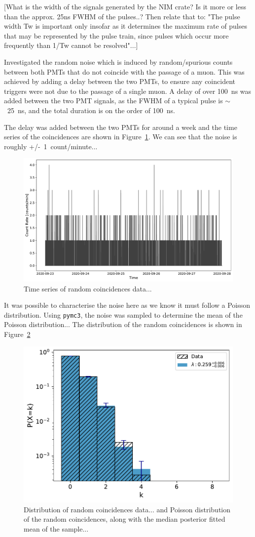 [What is the width of the signals generated by the NIM crate? Is it more or less than the approx. 25ns FWHM of the pulses..? Then relate that to: "The pulse width Tw is important only insofar as it determines the maximum rate of pulses that may be represented by the pulse train, since pulses which occur more frequently than 1/Tw cannot be resolved"...]


Investigated the random noise which is induced by random/spurious counts between both PMTs that do not coincide with the passage of a muon. This was achieved by adding a delay between the two PMTs, to ensure any coincident triggers were not due to the passage of a single muon. A delay of over 100~ns was added between the two PMT signals, as the FWHM of a typical pulse is $\sim$~25~ns, and the total duration is on the order of 100~ns.

The delay was added between the two PMTs for around a week and the time series of the coincidences are shown in Figure~\ref{fig:random_coinciences}. We can see that the noise is roughly +/-~1~count/minute...

\begin{figure}[ht!]
	\centering
	\includegraphics[width=0.6\columnwidth]{random_noise_timeseries.pdf}
	\caption{Time series of random coincidences data...}
	\label{fig:random_coinciences}
\end{figure}

It was possible to characterise the noise here as we know it must follow a Poisson distribution. Using \verb|pymc3|, the noise was sampled to determine the mean of the Poisson distribution... The distribution of the random coincidences is shown in Figure~\ref{fig:random_coinciences_dist}

\begin{figure}[ht!]
	\centering
	\includegraphics[width=0.6\columnwidth]{random_noise_fitted_poisson.pdf}
	\caption{Distribution of random coincidences data... and Poisson distribution of the random coincidences, along with the median posterior fitted mean of the sample...}
	\label{fig:random_coinciences_dist}
\end{figure}

